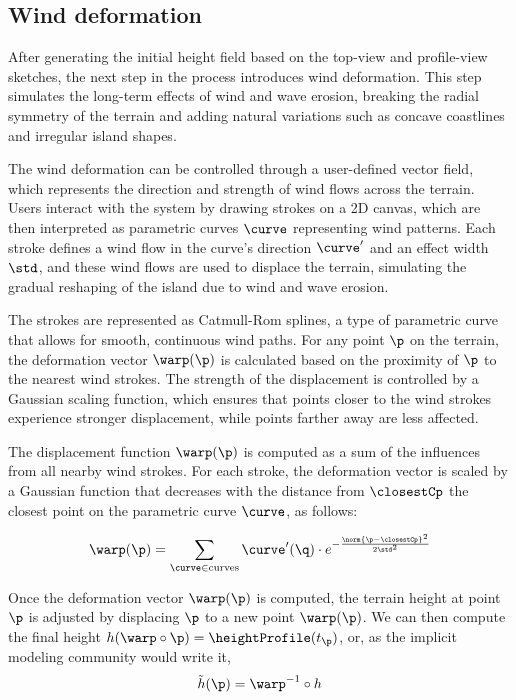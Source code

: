 \subsection{Wind deformation}

After generating the initial height field based on the top-view and profile-view sketches, the next step in the process introduces wind deformation. This step simulates the long-term effects of wind and wave erosion, breaking the radial symmetry of the terrain and adding natural variations such as concave coastlines and irregular island shapes.


The wind deformation can be controlled through a user-defined vector field, which represents the direction and strength of wind flows across the terrain. Users interact with the system by drawing strokes on a 2D canvas, which are then interpreted as parametric curves $\curve$ representing wind patterns. Each stroke defines a wind flow in the curve's direction $\curve'$ and an effect width $\std$, and these wind flows are used to displace the terrain, simulating the gradual reshaping of the island due to wind and wave erosion.

The strokes are represented as Catmull-Rom splines, a type of parametric curve that allows for smooth, continuous wind paths. For any point $\p$ on the terrain, the deformation vector $\warp(\p)$ is calculated based on the proximity of $\p$ to the nearest wind strokes. The strength of the displacement is controlled by a Gaussian scaling function, which ensures that points closer to the wind strokes experience stronger displacement, while points farther away are less affected.

The displacement function $\warp(\p)$ is computed as a sum of the influences from all nearby wind strokes. For each stroke, the deformation vector is scaled by a Gaussian function that decreases with the distance from $\closestCp$ the closest point on the parametric curve $\curve$, as follows:

\begin{align}
    \warp(\p) = \sum_{\curve \in \text{curves}} \curve'(\q) \cdot e^{-\frac{\norm{\p - \closestCp}^2}{2 \std^2}}
\end{align}


Once the deformation vector $\warp(\p)$ is computed, the terrain height at point $\p$ is adjusted by displacing $\p$ to a new point $\warp(\p)$.
We can then compute the final height $h(\warp \circ \p) = \heightProfile(t_{\p})$, or, as the implicit modeling community would write it, 
\begin{align}
    \Tilde{h}(\p) = \warp^{-1} \circ h
\end{align}

